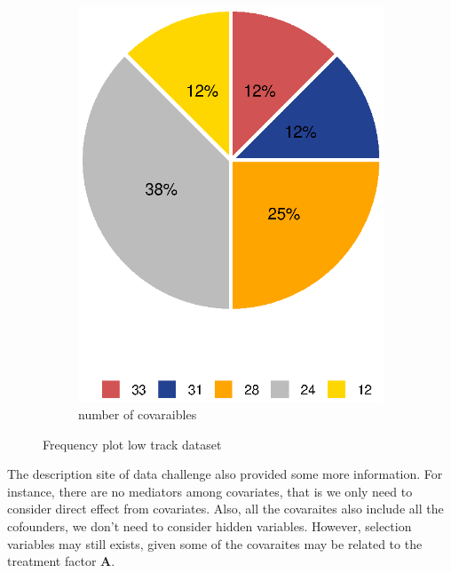 \documentclass[12pt, oneside]{article}
\newcommand{\bA}{\mathbf{A}}
\begin{document}
\begin{figure}[!htb]
\begin{subfigure}{.5\textwidth}
  \includegraphics[width=1\linewidth]{../plot/var_freq}
  \caption{number of covaraibles}
\end{subfigure}
\caption{Frequency plot low track dataset}
\label{fig:pie}
\end{figure}

The description site of data challenge also provided some more information. For instance, there are no mediators among covariates, that is we only need to consider direct effect from covariates. Also, all the covaraites also include all the cofounders, we don't need to consider hidden variables. However, selection variables may still exists, given some of the covaraites may be related to the treatment factor $\bA$.

  
\end{document}

